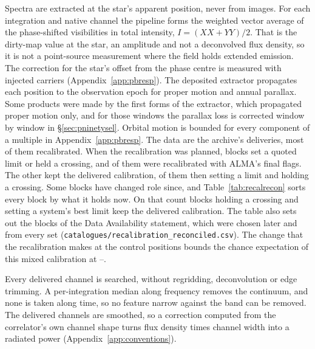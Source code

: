 Spectra are extracted at the star's apparent position, never from images. For
each integration and native channel the pipeline forms the weighted vector
average of the phase-shifted visibilities in total intensity, $I=(XX+YY)/2$.
That is the dirty-map value at the star, an amplitude and not a deconvolved
flux density, so it is not a point-source measurement where the field holds
extended emission. The correction for the star's offset from the phase
centre is measured with injected carriers (Appendix~\ref{app:pbresp}).
The deposited extractor propagates each position to the observation epoch
for proper motion and annual parallax. Some products were made by the first
forms of the extractor, which propagated proper motion only, and for those
windows the parallax loss is corrected window by window in
\S\ref{sec:pninetysel}.
Orbital motion is bounded for every component of a multiple in
Appendix~\ref{app:pbresp}.
%
The data are the archive's deliveries, most of them recalibrated. When the
recalibration was planned, \RflNEbCoreAll{} blocks set a quoted limit or held
a crossing, and \RflNEbCore{} of them were recalibrated with ALMA's final
flags. The other \RflNEbNot{} kept the delivered calibration, \RflNNotLim{}
of them then setting a limit and \RflNNotCross{} holding a crossing. Some
blocks have changed role since, and Table~\ref{tab:recalrecon} sorts every
block by what it holds now. On that count \LrRecNCrossNotRec{} blocks holding
a crossing and \LrRecNBestNotRec{} setting a system's best limit keep the
delivered calibration. The table also sets out the \XgNBlkPlan{} blocks of
the Data Availability statement, which were chosen later and from every set
(\texttt{catalogues/\allowbreak recalibration\_reconciled.csv}). The change that the recalibration makes at the control
positions bounds the chance expectation of this mixed calibration at
\RflCeLo--\RflCeHi.

Every delivered channel is searched, without regridding, deconvolution or
edge trimming. A per-integration median along frequency removes the
continuum, and none is taken along time, so no feature narrow against the
band can be removed. The delivered channels are smoothed, so a correction
computed from the correlator's own channel shape turns flux density times
channel width into a radiated power (Appendix~\ref{app:conventions}).

